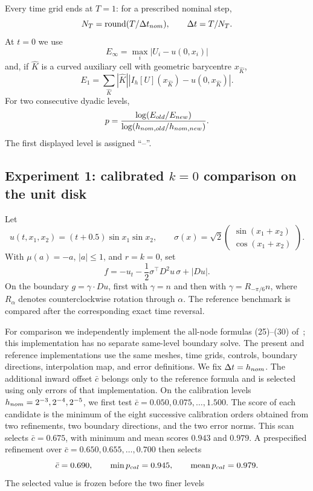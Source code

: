 \documentclass[10pt,a4paper]{amsart}
\begin{document}
Every time grid ends at $T=1$: for a prescribed nominal step,
\begin{equation}
 N_T=\operatorname{round}(T/\Delta t_{\rm nom}),
 \qquad \Delta t=T/N_T.
 \label{eq:numerical-time-alignment}
\end{equation}
At $t=0$ we use
\[
 E_\infty=\max_i|U_i-u(0,x_i)|
\]
and, if $\widehat K$ is a curved auxiliary cell with geometric barycentre
$x_{\widehat K}$,
\begin{equation}
 E_1=\sum_{\widehat K}|\widehat K|
 \left|I_h[U](x_{\widehat K})-u(0,x_{\widehat K})\right|.
 \label{eq:barycentric-E1}
\end{equation}
For two consecutive dyadic levels,
\[
 p=\frac{\log(E_{\rm old}/E_{\rm new})}
          {\log(h_{{\rm nom,old}}/h_{{\rm nom,new}})}.
\]
The first displayed level is assigned ``--''.

\subsection{Experiment 1: calibrated \texorpdfstring{$k=0$}{k=0}
comparison on the unit disk}
\label{sec:disk-comparison}

Let
\[
 u(t,x_1,x_2)=(t+0.5)\sin x_1\sin x_2,\qquad
 \sigma(x)=\sqrt2
 \begin{pmatrix}\sin(x_1+x_2)\\ \cos(x_1+x_2)\end{pmatrix}.
\]
With $\mu(a)=-a$, $|a|\le1$, and $r=k=0$, set
\begin{equation}
 f=-u_t-\frac12\sigma^\top D^2u\,\sigma+|Du|.
 \label{eq:experiment2-source}
\end{equation}
On the boundary $g=\gamma\cdot Du$, first with $\gamma=n$ and then with
$\gamma=R_{-\pi/6}n$, where $R_\alpha$ denotes counterclockwise rotation
through $\alpha$.  The reference benchmark is compared after the
corresponding exact time reversal.

For comparison we independently implement the all-node formulas
(25)--(30) of~\cite{CalzolaEtAl2023}; this implementation has no separate
same-level boundary solve.  The present and reference implementations use the
same meshes, time grids, controls, boundary directions, interpolation map, and
error definitions.  We fix $\Delta t=h_{\rm nom}$.  The additional inward
offset $\bar c$ belongs only to the reference formula and is selected using
only errors of that implementation.  On the calibration levels
$h_{\rm nom}=2^{-3},2^{-4},2^{-5}$, we first test
$\bar c=0.050,0.075,\ldots,1.500$.  The score of each candidate is the minimum
of the eight successive calibration orders obtained from two refinements, two
boundary directions, and the two error norms.  This scan selects
$\bar c=0.675$, with minimum and mean scores $0.943$ and $0.979$.
A prespecified refinement over $\bar c=0.650,0.655,\ldots,0.700$ then selects
\begin{equation}
 \bar c=0.690,
 \qquad \min p_{\rm cal}=0.945,
 \qquad \operatorname{mean}p_{\rm cal}=0.979.
 \label{eq:selected-cbar}
\end{equation}
The selected value is frozen before the two finer levels
\end{document}
